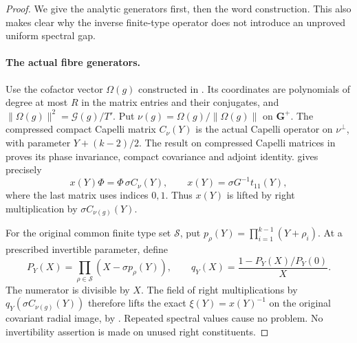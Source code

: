 \begin{proof}
We give the analytic generators first, then the word construction.
This also makes clear why the inverse finite-type operator does
not introduce an unproved uniform spectral gap.

\paragraph{The actual fibre generators.}
Use the cofactor vector $\Omega(g)$ constructed in
.
Its coordinates are polynomials of
degree at most $R$ in the matrix entries and their conjugates,
and $\|\Omega(g)\|^2=\mathcal G(g)/T'$.  Put
$\nu(g)=\Omega(g)/\|\Omega(g)\|$ on $\mathbf G^+$.
The compressed compact Capelli matrix $C_\nu(Y)$ is the actual
Capelli operator on $\nu^\perp$, with parameter
$Y+(k-2)/2$.  The result on compressed Capelli matrices in
 proves its
phase invariance, compact covariance and adjoint identity.
gives precisely
\begin{equation}\label{actual-top-lift-fibre}
 x(Y)\Phi=\Phi\,\sigma C_\nu(Y),\qquad
 x(Y)=\sigma G^{-1}t_{11}(Y),
\end{equation}
where the last matrix uses indices $0,1$.  Thus $x(Y)$ is lifted
by right multiplication by $\sigma C_{\nu(g)}(Y)$.

For the original common finite type set $\mathcal S$, put
$p_\rho(Y)=\prod_{i=1}^{k-1}(Y+\rho_i)$.  At a prescribed
invertible parameter, define
\[
 P_Y(X)=\prod_{\rho\in\mathcal S}(X-\sigma p_\rho(Y)),\qquad
 q_Y(X)=\frac{1-P_Y(X)/P_Y(0)}{X}.
\]
The numerator is divisible by $X$.  The field of right
multiplications by $q_Y(\sigma C_{\nu(g)}(Y))$ therefore lifts
the exact $\xi(Y)=x(Y)^{-1}$ on the original covariant radial
image, by .
Repeated spectral
values cause no problem.  No invertibility assertion is made
on unused right constituents.


\end{proof}
